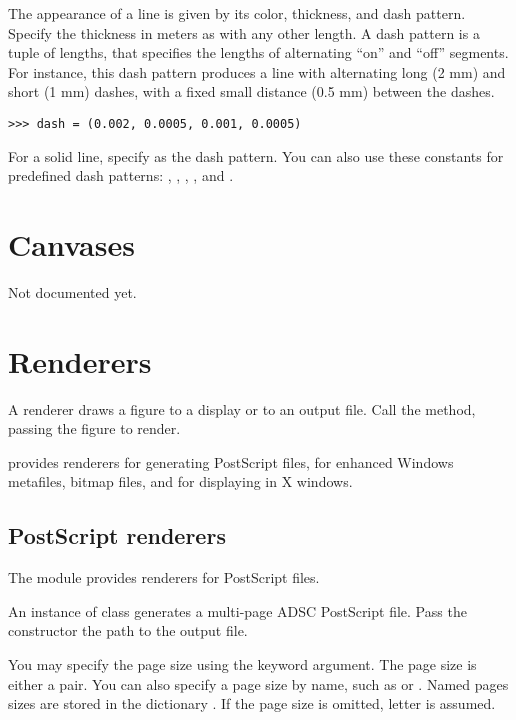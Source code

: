 The appearance of a line is given by its color, thickness, and dash
pattern.  Specify the thickness in meters as with any other length.  A
dash pattern is a tuple of lengths, that specifies the lengths of
alternating ``on'' and ``off'' segments.  For instance, this dash
pattern produces a line with alternating long (2 mm) and short (1 mm)
dashes, with a fixed small distance (0.5 mm) between the dashes.
\begin{verbatim}
>>> dash = (0.002, 0.0005, 0.001, 0.0005)
\end{verbatim}
For a solid line, specify  as the dash pattern.  You can also
use these constants for predefined dash patterns: ,
, , , and
.


\section{Canvases}

Not documented yet.


\section{Renderers}

A renderer draws a figure to a display or to an output file.  Call the
 method, passing the figure to render.

\pyhep provides renderers for generating PostScript files, for enhanced
Windows metafiles, bitmap files, and for displaying in X windows.

\subsection{PostScript renderers}

The module  provides renderers for
PostScript files.  

An instance of class  generates a multi-page ADSC
PostScript file.  Pass the constructor the path to the output file.  

You may specify the page size using the  keyword
argument.  The page size is either a  pair.  You
can also specify a page size by name, such as  or
.  Named pages sizes are stored in the dictionary
.  If the page size is omitted, letter is
assumed.

